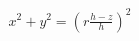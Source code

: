 \documentclass[preview]{standalone}
\begin{document}
\begin{align*}
x^2 + y^2 = (r\frac{h-z}{h})^2
\end{align*}
\end{document}
